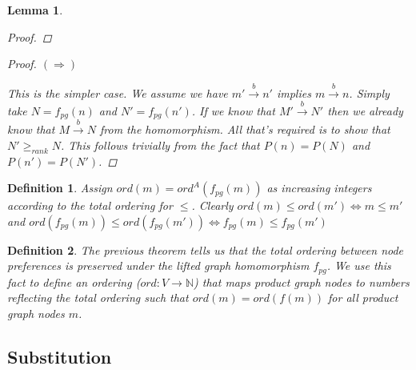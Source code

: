 \documentclass[twocolumn]{sig-alternate-10pt}
\newtheorem{defn}{Definition}
\newtheorem{lem}[thm]{Lemma}
\begin{document}
\begin{lem}
\begin{proof}
  \end{proof}

  \begin{proof}
    $(\Rightarrow)$

    This is the simpler case. We assume we have $m' \overset{b}{\rightarrow} n'$ implies $m \overset{b}{\rightarrow} n$.
    Simply take $N = f_{pg}(n)$ and $N' = f_{pg}(n')$. If we know that $M' \overset{b}{\rightarrow} N'$ then we already know that $M \overset{b}{\rightarrow} N$ from the homomorphism. All that's required is to show that $N' \geq_{rank} N$. This follows trivially from the fact that $P(n) = P(N)$ and $P(n') = P(N')$.
  \end{proof}

\end{lem}

\begin{defn}
  Assign $ord(m) = ord^A(f_{pg}(m))$ as increasing integers according to the total ordering for $\leq$.
  Clearly $ord(m) \leq ord(m') \iff m \leq m'$ and $ord(f_{pg}(m)) \leq ord(f_{pg}(m')) \iff f_{pg}(m) \leq f_{pg}(m')$
\end{defn}

\begin{defn}
  The previous theorem tells us that the total ordering between node preferences is preserved under the lifted graph homomorphism $f_{pg}$. 
  We use this fact to define an ordering ($ord : V \rightarrow \mathbb{N}$) that maps product graph nodes to numbers reflecting the total ordering such that $ord(m) = ord(f(m))$ for all product graph nodes $m$.
\end{defn} 



\subsection{Substitution}
\end{document}
